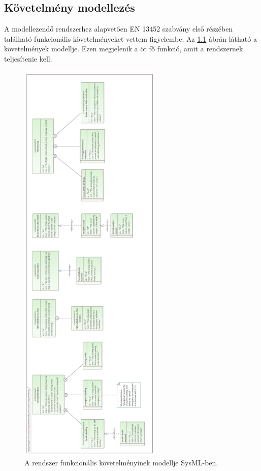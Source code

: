 \chapter{\modeling}\label{chap:model}
\section{Követelmény modellezés}
A modellezendő rendszerhez alapvetően EN 13452\cite{EN13452-1} szabvány első részében található funkcionális követelményeket vettem figyelembe.
Az \ref{fig:reqs} ábrán látható a követelmények modellje.
Ezen megjelenik a öt fő funkció, amit a rendszernek teljesítenie kell.

\begin{figure}
    \centering
    \includegraphics[height=200mm, keepaspectratio]{figures/Functional Requirements.png}
    \caption{A rendszer funkcionális követelményinek modellje SysML-ben.}
    \label{fig:reqs}
\end{figure}

